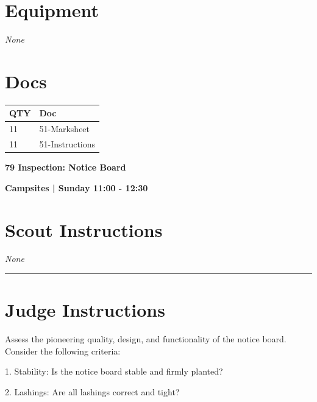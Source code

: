 \documentclass[10pt]{article}
\newcommand{\newtitle}[1]{\begin{center}{\Huge\bfseries #1 }\\ \vspace{5mm}\end{center}}
\newcommand{\newsubtitle}[1]{\begin{center}{\color{grey}\Large\bfseries #1 }\\ \vspace{5mm}\end{center}}
\begin{document}
	\begin{multicols}{2}

		\section*{\faWrench \: Equipment}

				\textit{None}
		
		\vfill\null
		\columnbreak

			\section*{\faFile \: Docs}
		 	\begin{center}
			\begin{tabular}{p{2cm}p{4cm}}

			\textbf{QTY} & \textbf{Doc} \\\toprule
										11&51-Marksheet\\\midrule
										11&51-Instructions\\\midrule
							\end{tabular}
			\end{center}
	

		\vfill\null

		\end{multicols}



	\vspace{1cm}


	\clearpage
		\newtitle{79 Inspection: Notice Board }
	\newsubtitle{Campsites | Sunday 11:00 - 12:30}
		\setcounter{section}{78}
	\section*{Scout Instructions}
		\textit{None}
	
	\vspace{0.5cm}
	\hrule
	\vspace{0.5cm}

		\section*{Judge Instructions}
		Assess the pioneering quality, design, and functionality of the notice board. Consider the following criteria:



1. Stability: Is the notice board stable and firmly planted?

2. Lashings: Are all lashings correct and tight?
\end{document}
